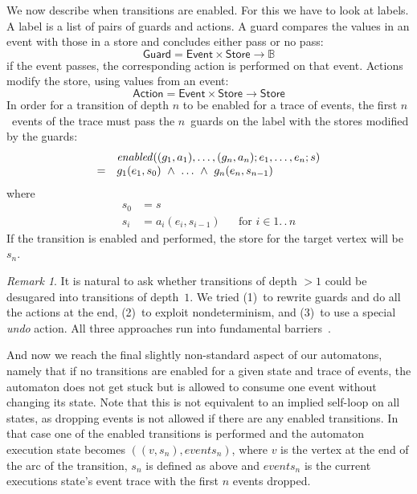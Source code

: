 \documentclass{sigplanconf} %
\newcommand{\note}[2]{\textcolor{gray}{[\textcolor{red}{#1}: #2]}}
\renewcommand{\note}[2]{}
\newcommand{\rg}[1]{\note{rg}{#1}}
\newcommand{\B}{\ensuremath{\mathbb{B}}}
\newcommand{\set}[1]{\ensuremath{\mathsf{#1}}}
\newcommand{\functionfont}[1]{\mathit{#1}}
\newcommand{\enabled}{\functionfont{enabled}}
\theoremstyle{definition}
\theoremstyle{remark}
\newtheorem{remark}{Remark}
\begin{document}
We now describe when transitions are enabled. For this we have to look
at labels. A label is a list of pairs of guards and actions. A
guard compares the values in an event with those in a store and
concludes either pass or no pass:
\[
\set{Guard} = \set{Event}\times\set{Store}\to\B
\]
if the event passes, the corresponding action is performed on that event.
Actions modify the store, using values from an event:
\[
\set{Action} = \set{Event}\times\set{Store}\to\set{Store}
\]
In order for a transition of depth $n$ to be enabled for a trace of
events, the first $n$~events of the trace must pass the $n$~guards
on the label with the stores modified by the guards:
\[
\begin{array}{c l}
& \enabled((g_1, a_1), \ldots, (g_n, a_n); e_1, \ldots, e_n; s) \\
 = &
g_1(e_1, s_0)\ \land\ \ldots\ \land\ g_n(e_n, s_{n-1}) 
\end{array}
\]
where
\begin{align}
  s_0 &=  s \\
  s_i &= a_i(e_i, s_{i-1}) &&\text{for $i\in1.\,.\,n$}
\end{align}
If the transition is enabled and performed, the store for the target vertex will be $s_n$.

\begin{remark}
It is natural to ask whether transitions of depth $>1$ could be desugared into transitions of depth~$1$.
We tried (1)~to rewrite guards and do all the actions at the end, (2)~to exploit nondeterminism, and (3)~to use a special \textit{undo} action.
All three approaches run into fundamental barriers~\cite{web:desugar}.
\end{remark}

And now we reach the final slightly non-standard aspect of our
automatons, namely that if no transitions are enabled for a given
state and trace of events, the automaton does not get stuck but is
allowed to consume one event without changing its state. Note that
this is not equivalent to an implied self-loop on all states, as
dropping events is not allowed if there are any enabled
transitions. In that case one of the enabled transitions is performed and
the automaton execution state becomes $((v, s_n), \mathit{events}_n)$, where $v$ is the vertex at the
end of the arc of the transition, $s_n$ is defined as above and
$\mathit{events}_n$ is the current executions state's event trace with the first
$n$ events dropped.
\rg{An example would help to understand this paragraph.}
\end{document}
